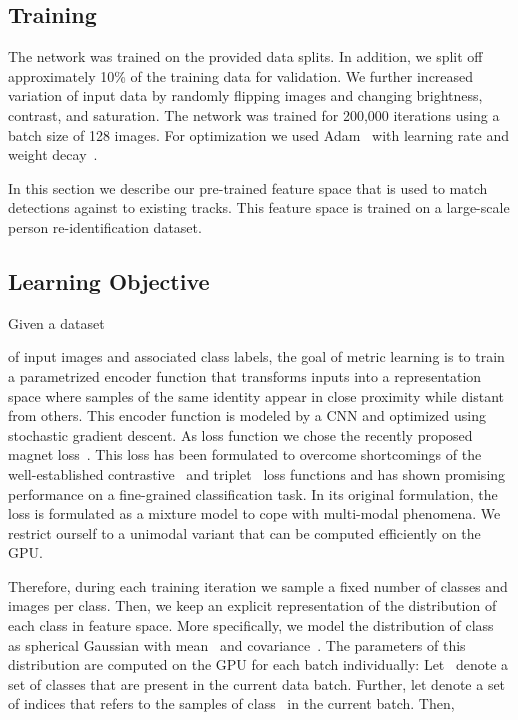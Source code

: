 \documentclass{article}
\begin{document}
\subsection{Training}

The network was trained on the provided data splits. In addition, we split off
approximately 10\% of the training data for validation.
We further increased variation of input data by randomly flipping images and
changing brightness, contrast, and saturation.
The network was trained for 200,000 iterations using a batch size of 128 images.
For optimization we used Adam~\cite{Kingma2014} with learning rate 
and weight decay~.

In this section we describe our pre-trained feature space that is used to
match detections against to existing tracks.
This feature space is trained on a large-scale person re-identification
dataset.


\subsection{Learning Objective}

Given a dataset

of input images and associated class labels, the goal of metric learning is to
train a parametrized encoder function  that
transforms inputs into a representation space where samples of the same
identity appear in close proximity while distant from others.
This encoder function is modeled by a CNN and optimized using stochastic
gradient descent.
As loss function we chose the recently proposed magnet loss~\cite{Rippel2016a}.
This loss has been formulated to overcome shortcomings of the well-established
contrastive~\cite{Chopra2005} and triplet~\cite{weinberger2009distance}
loss functions and has shown promising performance on a fine-grained
classification task.
In its original formulation, the loss is formulated as a mixture model to cope
with multi-modal phenomena. We restrict ourself to a unimodal variant that can
be computed efficiently on the GPU.

Therefore, during each training iteration
we sample a fixed number of  classes and  images per
class.
Then, we keep an explicit representation of the distribution of each class in
feature space.
More specifically, we model the distribution of class~ as
spherical Gaussian 
with mean~ and
covariance~.
The parameters of this distribution are computed on the GPU for each batch
individually:
Let~ denote a set of classes that are present in the current data batch.
Further, let 
denote a set of indices that refers to the  samples of
class~ in the current batch.
Then,
\end{document}
